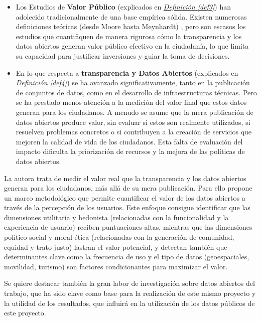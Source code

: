\begin{itemize}
	\item Los Estudios de \textbf{Valor Público} (explicados en \hyperref[def3]{\textit{Definición \ref*{def3}}}) han adolecido tradicionalmente de una base empírica sólida. Existen numerosas definiciones teóricas (desde Moore hasta Meynhardt) \citep{Meynhardt19032009}, pero son escasos los estudios que cuantifiquen de manera rigurosa cómo la transparencia y los datos abiertos generan valor público efectivo en la ciudadanía, lo que limita su capacidad para justificar inversiones y guiar la toma de decisiones.
	
	\item En lo que respecta a \textbf{transparencia y Datos Abiertos} (explicados en \hyperref[def4]{\textit{Definición \ref*{def4}}}) se ha avanzado significativamente, tanto en la publicación de conjuntos de datos, como en el desarrollo de infraestructuras técnicas. Pero se ha prestado menos atención a la medición del valor final que estos datos generan para los ciudadanos. A menudo se asume que la mera publicación de datos abiertos produce valor, sin evaluar si estos son realmente utilizados, si resuelven problemas concretos o si contribuyen a la creación de servicios que mejoren la calidad de vida de los ciudadanos. Esta falta de evaluación del impacto dificulta la priorización de recursos y la mejora de las políticas de datos abiertos.
\end{itemize}

La autora trata de medir el valor real que la transparencia y los datos abiertos generan para los ciudadanos, más allá de su mera publicación. Para ello propone un marco metodológico que permite cuantificar el valor de los datos abiertos a través de la percepción de los usuarios. Este enfoque consigue identificar que las dimensiones utilitaria y hedonista (relacionadas con la funcionalidad y la experiencia de usuario) reciben puntuaciones altas, mientras que las dimensiones político-social y moral-ética (relacionadas con la generación de comunidad, equidad y trato justo) lastran el valor potencial, y detectan también que determinantes clave como la frecuencia de uso y el tipo de datos (geoespaciales, movilidad, turismo) son factores condicionantes para maximizar el valor.

Se quiere destacar también la gran labor de investigación sobre datos abiertos del trabajo, que ha sido clave como base para la realización de este mismo proyecto y la utilidad de los resultados, que influirá en la utilización de los datos públicos de este proyecto.

